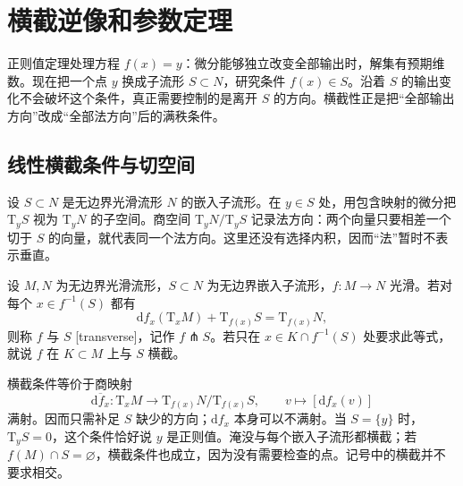 
% 
% 

\section{横截逆像和参数定理}
\label{g2:sec:1403}

正则值定理处理方程 \(f(x)=y\)：微分能够独立改变全部输出时，解集有预期维数。现在把一个点 \(y\) 换成子流形 \(S\subset N\)，研究条件 \(f(x)\in S\)。沿着 \(S\) 的输出变化不会破坏这个条件，真正需要控制的是离开 \(S\) 的方向。横截性正是把“全部输出方向”改成“全部法方向”后的满秩条件。

\subsection{线性横截条件与切空间}
\label{g2:subsec:1403:01}

设 \(S\subset N\) 是无边界光滑流形 \(N\) 的嵌入子流形。在 \(y\in S\) 处，用包含映射的微分把 \(\mathrm{T}_yS\) 视为 \(\mathrm{T}_yN\) 的子空间。商空间 \(\mathrm{T}_yN/\mathrm{T}_yS\) 记录法方向：两个向量只要相差一个切于 \(S\) 的向量，就代表同一个法方向。这里还没有选择内积，因而“法”暂时不表示垂直。

\begin{definition}[横截性]\label{g2:def:transversality}
	设 \(M,N\) 为无边界光滑流形，\(S\subset N\) 为无边界嵌入子流形，\(f:M\to N\) 光滑。若对每个 \(x\in f^{-1}(S)\) 都有
	\begin{equation}\label{g2:eq:transverse-linear-condition}
		\mathrm{d}f_x(\mathrm{T}_xM)+\mathrm{T}_{f(x)}S=\mathrm{T}_{f(x)}N,
	\end{equation}
	则称 \(f\) 与 \(S\) [transverse]，记作 \(f\pitchfork S\)。若只在 \(x\in K\cap f^{-1}(S)\) 处要求此等式，就说 \(f\) 在 \(K\subset M\) 上与 \(S\) 横截。
\end{definition}

横截条件等价于商映射
\[
	\overline{\mathrm{d}f_x}:\mathrm{T}_xM\longrightarrow\mathrm{T}_{f(x)}N/\mathrm{T}_{f(x)}S,
	\qquad v\longmapsto[\mathrm{d}f_x(v)]
\]
满射。因而只需补足 \(S\) 缺少的方向；\(\mathrm{d}f_x\) 本身可以不满射。当 \(S=\{y\}\) 时，\(\mathrm{T}_yS=0\)，这个条件恰好说 \(y\) 是正则值。淹没与每个嵌入子流形都横截；若 \(f(M)\cap S=\varnothing\)，横截条件也成立，因为没有需要检查的点。记号中的横截并不要求相交。

